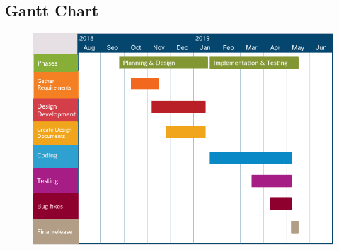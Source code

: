 \documentclass[letterpaper,10pt,titlepage, onecolumn, draftclsnofoot]{IEEEtran}
\begin{document}
    \subsection{Gantt Chart}
     \begin{figure}[H]
         \centering
                \includegraphics[width=\linewidth]{./image.png}
     \end{figure}
 
\newpage  
\end{document}
